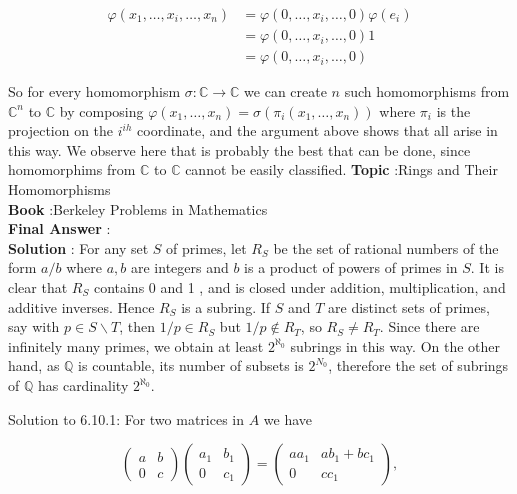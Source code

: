 \documentclass[10pt]{article}
\begin{document}
$$
\begin{aligned}
\varphi\left(x_{1}, \ldots, x_{i}, \ldots, x_{n}\right) &=\varphi\left(0, \ldots, x_{i}, \ldots, 0\right) \varphi\left(e_{i}\right) \\
&=\varphi\left(0, \ldots, x_{i}, \ldots, 0\right) 1 \\
&=\varphi\left(0, \ldots, x_{i}, \ldots, 0\right)
\end{aligned}
$$

So for every homomorphism $\sigma: \mathbb{C} \rightarrow \mathbb{C}$ we can create $n$ such homomorphisms from $\mathbb{C}^{n}$ to $\mathbb{C}$ by composing $\varphi\left(x_{1}, \ldots, x_{n}\right)=\sigma\left(\pi_{i}\left(x_{1}, \ldots, x_{n}\right)\right)$ where $\pi_{i}$ is the projection on the $i^{i h}$ coordinate, and the argument above shows that all arise in this way. We observe here that is probably the best that can be done, since homomorphims from $\mathbb{C}$ to $\mathbb{C}$ cannot be easily classified.
\textbf{Topic} :Rings and Their Homomorphisms \\
\textbf{Book} :Berkeley Problems in Mathematics\\
\textbf{Final Answer} :\\


\textbf{Solution} : For any set $S$ of primes, let $R_{S}$ be the set of rational numbers of the form $a / b$ where $a, b$ are integers and $b$ is a product of powers of primes in $S$. It is clear that $R_{S}$ contains 0 and 1 , and is closed under addition, multiplication, and additive inverses. Hence $R_{S}$ is a subring. If $S$ and $T$ are distinct sets of primes, say with $p \in S \backslash T$, then $1 / p \in R_{S}$ but $1 / p \notin R_{T}$, so $R_{S} \neq R_{T}$. Since there are infinitely many primes, we obtain at least $2^{\aleph_{0}}$ subrings in this way. On the other hand, as $\mathbb{Q}$ is countable, its number of subsets is $2^{N_{0}}$, therefore the set of subrings of $\mathbb{Q}$ has cardinality $2^{\aleph_{0}}$.



Solution to 6.10.1: For two matrices in $A$ we have

$$
\left(\begin{array}{ll}
a & b \\
0 & c
\end{array}\right)\left(\begin{array}{cc}
a_{1} & b_{1} \\
0 & c_{1}
\end{array}\right)=\left(\begin{array}{cc}
a a_{1} & a b_{1}+b c_{1} \\
0 & c c_{1}
\end{array}\right),
$$
\end{document}
